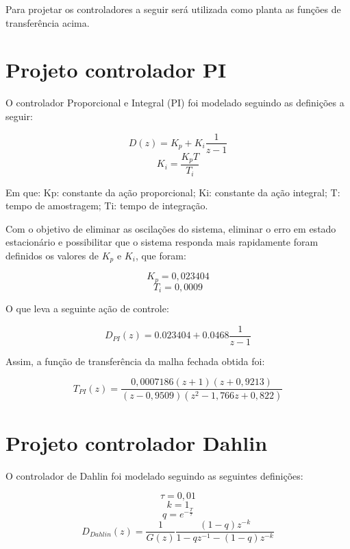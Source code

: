 \documentclass[
oneside,					%
a4paper,					%
english,					%
brazil,					%
]{abntex2}
\begin{document}
Para projetar os controladores a seguir será utilizada como planta as funções de transferência acima.

\section{Projeto controlador PI}

O controlador Proporcional e Integral (PI) foi modelado seguindo as definições a seguir:

\begin{equation} 
D(z) = K_p + K_i \frac{1}{z-1}
\end{equation}
\begin{equation} 
K_i = \frac{K_p T}{T_i}
\end{equation}

Em que:
Kp: constante da ação proporcional;
Ki: constante da ação integral;
T: 	tempo de amostragem;
Ti:	tempo de integração.


Com o objetivo de eliminar as oscilações do sistema, eliminar o erro em estado estacionário e possibilitar que o sistema responda mais rapidamente foram definidos os valores de $K_p$ e $K_i$, que foram:

\begin{equation} 
K_p = 0,023404
\end{equation}
\begin{equation} 
T_i = 0,0009
\end{equation}

O que leva a seguinte ação de controle:

\begin{equation}
	D_{PI}(z) = 0.023404 + 0.0468 \frac{1}{z-1} 
\end{equation}

Assim, a função de transferência da malha fechada obtida foi:

\begin{equation} 
T_{PI}(z) = \frac{0,0007186(z+1)(z+0,9213)}{(z-0,9509)(z^2 - 1,766z + 0,822)}
\end{equation}

\section{Projeto controlador Dahlin}

O controlador de Dahlin foi modelado seguindo as seguintes definições:

\begin{equation} 
\tau = 0,01
\end{equation}
\begin{equation} 
k = 1
\end{equation}
\begin{equation} 
q = e^{-\frac{T}{\tau}}
\end{equation}
\begin{equation} 
D_{Dahlin}(z) = \frac{1}{G(z)}\frac{(1-q)z^{-k}}{1-qz^{-1}-(1-q)z^{-k}}
\end{equation}
\end{document}
